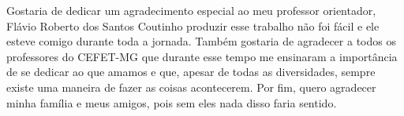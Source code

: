 %
%

\begin{agradecimentos}

Gostaria de dedicar um agradecimento especial ao meu professor orientador, Flávio Roberto dos Santos Coutinho produzir esse trabalho não foi fácil e ele esteve comigo durante toda a jornada. Também gostaria de agradecer a todos os professores do CEFET-MG que durante esse tempo me ensinaram a importância de se dedicar ao que amamos e que, apesar de todas as diversidades, sempre existe uma maneira de fazer as coisas acontecerem. Por fim, quero agradecer minha família e meus amigos, pois sem eles nada disso faria sentido.

\end{agradecimentos}
